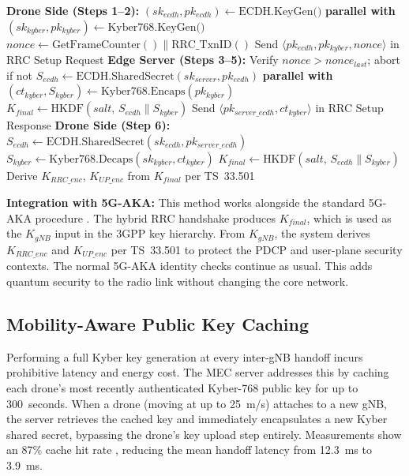 \documentclass{ieeeaccess}
\begin{document}
\begin{algorithm}[htbp]
\caption{Hybrid PQC Handshake Protocol}
\label{alg:handshake}
\begin{algorithmic}[1]
\STATE \textbf{Drone Side (Steps 1--2):}
\STATE $(sk_{ecdh}, pk_{ecdh}) \leftarrow \text{ECDH.KeyGen()}$ \textbf{parallel with}
\STATE $(sk_{kyber}, pk_{kyber}) \leftarrow \text{Kyber768.KeyGen()}$
\STATE $nonce \leftarrow \text{GetFrameCounter}() \| \text{RRC\_TxnID}()$
\STATE Send $\langle pk_{ecdh}, pk_{kyber}, nonce \rangle$ in RRC Setup Request
\STATE \textbf{Edge Server (Steps 3--5):}
\STATE Verify $nonce > nonce_{last}$; abort if not
\STATE $S_{ecdh} \leftarrow \text{ECDH.SharedSecret}(sk_{server}, pk_{ecdh})$ \textbf{parallel with}
\STATE $(ct_{kyber}, S_{kyber}) \leftarrow \text{Kyber768.Encaps}(pk_{kyber})$
\STATE $K_{final} \leftarrow \text{HKDF}(\mathit{salt},\, S_{ecdh} \| S_{kyber})$
\STATE Send $\langle pk_{server\_ecdh}, ct_{kyber} \rangle$ in RRC Setup Response
\STATE \textbf{Drone Side (Step 6):}
\STATE $S_{ecdh} \leftarrow \text{ECDH.SharedSecret}(sk_{ecdh}, pk_{server\_ecdh})$
\STATE $S_{kyber} \leftarrow \text{Kyber768.Decaps}(sk_{kyber}, ct_{kyber})$
\STATE $K_{final} \leftarrow \text{HKDF}(\mathit{salt},\, S_{ecdh} \| S_{kyber})$
\STATE Derive $K_{RRC\_enc}$, $K_{UP\_enc}$ from $K_{final}$ per TS~33.501
\end{algorithmic}
\end{algorithm}

\textbf{Integration with 5G-AKA:} This method works alongside the standard 5G-AKA procedure \cite{ref16}. The hybrid RRC handshake produces $K_{final}$, which is used as the $K_{gNB}$ input in the 3GPP key hierarchy. From $K_{gNB}$, the system derives $K_{RRC\_enc}$ and $K_{UP\_enc}$ per TS~33.501 to protect the PDCP and user-plane security contexts. The normal 5G-AKA identity checks continue as usual. This adds quantum security to the radio link without changing the core network.

\subsection{Mobility-Aware Public Key Caching}

Performing a full Kyber key generation at every inter-gNB handoff incurs prohibitive latency and energy cost. The MEC server addresses this by caching each drone's most recently authenticated Kyber-768 public key for up to 300~seconds. When a drone (moving at up to 25~m/s) attaches to a new gNB, the server retrieves the cached key and immediately encapsulates a new Kyber shared secret, bypassing the drone's key upload step entirely. Measurements show an 87\% cache hit rate \cite{ref19}, reducing the mean handoff latency from 12.3~ms to 3.9~ms.
\end{document}
